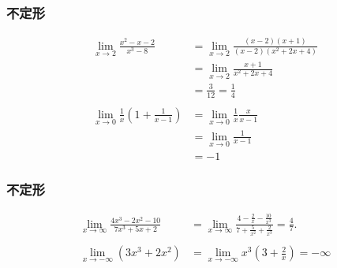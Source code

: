 \documentclass[dvipdfmx,cjk,10.2pt]{beamer}
\theoremstyle{definition}
\begin{document}


\begin{frame}
\frametitle{不定形} 


\begin{align*}
\lim_{x\to 2} \frac{x^2-x-2}{x^3-8}
& =  \lim_{x\to 2} \frac{(x-2)(x+1)}{(x-2)(x^2+2x+4)} \\
& =   \lim_{x\to 2}\frac{x+1}{x^2+2x+4} \\
& = \frac{3}{12}=\frac{1}{4} \\
\ & \ \\
\lim_{x\to 0} \frac{1}{x}(1+\frac{1}{x-1})
& =  \lim_{x\to 0} \frac{1}{x} \frac{x}{x-1} \\
& =  \lim_{x\to 0}\frac{1}{x-1} \\
& = -1
\end{align*}




\end{frame}




\begin{frame}
\frametitle{不定形} 


\begin{align*}
\lim_{x \to \infty}\frac{4x^3-2x^2-10}{7x^3+5x+2} 
& = \lim_{x \to \infty} \frac{4-\frac{2}{x}-\frac{10}{x^3}}{7+\frac{5}{x^2}+\frac{2}{x^3}} = \frac{4}{7}. \\
\ & \ \\
\lim_{x\to -\infty} (3x^3+2x^2)
& =  \lim_{x\to -\infty} x^3(3+\frac{2}{x})  = -\infty
\end{align*}


\end{frame}


\end{document}
